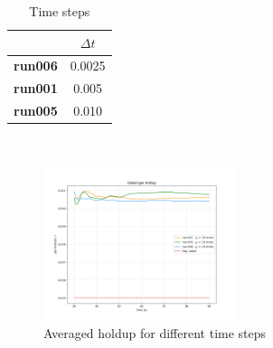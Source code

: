 \documentclass[11pt,a4paper]{article}
\begin{document}
\begin{table}[H]
    \centering 
    \begin{tabular}{|p{8em} c |}
    \hline
    \rowcolor{bluePoli!40}
     & \textbf{$\Delta t$} \T\B \\
    \hline \hline
    \textbf{run006} & 0.0025 \T\B \\
    \textbf{run001} & 0.005 \T\B \\
    \textbf{run005} & 0.010 \T\B \\
    \hline
    \end{tabular}
    \\[10pt]
    \caption{Time steps}
    \label{table:time_steps}
\end{table}

\begin{figure}[H]
    \centering
    \includegraphics[width=0.5\textwidth]{Images/graphs/time/holdUp10.png}
    \caption{Averaged holdup for different time steps}
    \label{fig:holdup_time}
\end{figure}
\end{document}
